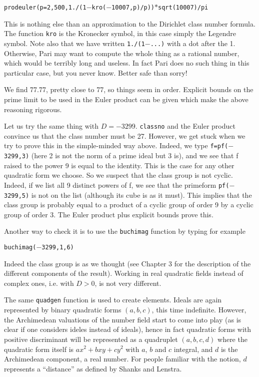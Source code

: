 \centerline{\tt prodeuler(p=2,500,1./(1$-$kro($-$10007,p)/p))$*$sqrt(10007)/pi}

This is nothing else than an approximation to the Dirichlet class number
formula. The function {\tt kro} is the Kronecker symbol, in this case simply
the Legendre symbol. Note also that we have written {\tt 1./(1$-$...)} with
a dot after the 1. Otherwise, Pari may want to compute the whole thing as
a rational number, which would be terribly long and useless. In fact Pari
does no such thing in this particular case, but you never know. Better safe
than sorry!

We find 77.77, pretty close to 77, so things seem in order. Explicit bounds
on the prime limit to be used in the Euler product can be given which make
the above reasoning rigorous.

Let us try the same thing with $D=-3299$. {\tt classno} and the Euler product
convince us that the class number must be 27. However, we get stuck when we try
to prove this in the simple-minded way above. Indeed, we type
{\tt f=pf($-$3299,3)} (here 2 is not the norm of a prime ideal but 3 is), and
we see that f raised to the power 9 is equal to the identity. This is the
case for any other quadratic form we choose. So we suspect that the class
group is not cyclic. Indeed, if we list all 9 distinct powers of f, we see
that the primeform {\tt pf($-$3299,5)} is not on the list (although its cube
is as it must). This implies that the class group is probably equal to a
product of a cyclic group of order 9 by a cyclic group of order 3. The
Euler product plus explicit bounds prove this.

Another way to check it is to use the {\tt buchimag} function by typing
for example

\centerline{\tt buchimag($-$3299,1,6)}

Indeed the class group is as we thought (see Chapter 3 for the description of
the different components of the result).
\medskip
Working in real quadratic fields instead of complex ones, i.e. with $D>0$, is
not very different.

The same {\tt quadgen} function is used to create elements. Ideals are again
represented by binary quadratic forms $(a,b,c)$, this time indefinite. However,
the Archimedean valuations of the number field start to come into play (as
is clear if one considers ideles instead of ideals), hence in fact quadratic
forms with positive discriminant will be represented as a quadruplet
$(a,b,c,d)$ where the quadratic form itself is $ax^2+bxy+cy^2$ with $a$,
$b$ and $c$ integral, and $d$ is the Archimedean component, a real number.
For people familiar with the notion, $d$ represents a ``distance'' as defined
by Shanks and Lenstra.

